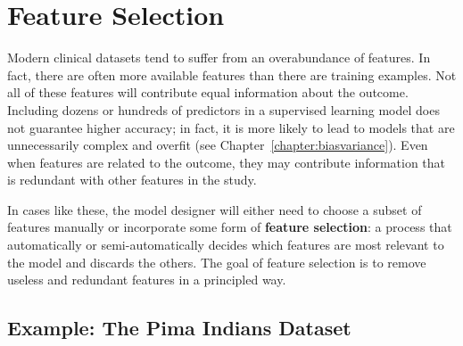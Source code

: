 \chapter{Feature Selection \label{chapter:featureselection}}

Modern clinical datasets tend to suffer from an overabundance of features. In fact, there are often more available features than there are training examples. Not all of these features will contribute equal information about the outcome. Including dozens or hundreds of predictors in a supervised learning model does not guarantee higher accuracy; in fact, it is more likely to lead to models that are unnecessarily complex and overfit (see Chapter~\ref{chapter:biasvariance}). Even when features are related to the outcome, they may contribute information that is redundant with other features in the study. 

In cases like these, the model designer will either need to choose a subset of features manually or incorporate some form of \textbf{feature selection}: a process that automatically or semi-automatically decides which features are most relevant to the model and discards the others. The goal of feature selection is to remove useless and redundant features in a principled way. 


\section{Example: The Pima Indians Dataset}

